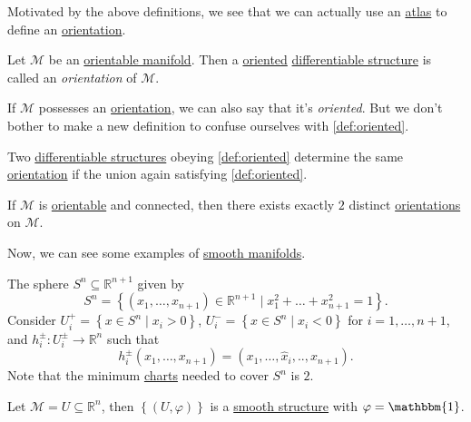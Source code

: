 Motivated by the above definitions, we see that we can actually use an \hyperref[def:atlas]{atlas} to define an \hyperref[def:orientation]{orientation}.

\begin{definition}[Orientation]\label{def:orientation}
	Let \(\mathcal{M} \) be an \hyperref[def:orientable]{orientable manifold}. Then a \hyperref[def:oriented]{oriented} \hyperref[def:smooth-structure]{differentiable structure} is called an \emph{orientation} of \(\mathcal{M} \).
\end{definition}

If \(\mathcal{M} \) possesses an \hyperref[def:orientation]{orientation}, we can also say that it's \emph{oriented}. But we don't bother to make a new definition to confuse ourselves with \autoref{def:oriented}.

\begin{remark}
	Two \hyperref[def:smooth-structure]{differentiable structures} obeying \autoref{def:oriented} determine the same \hyperref[def:orientation]{orientation} if the union again satisfying \autoref{def:oriented}.
\end{remark}

\begin{remark}
	If \(\mathcal{M} \) is \hyperref[def:orientable]{orientable} and connected, then there exists exactly \(2\) distinct \hyperref[def:orientation]{orientations} on \(\mathcal{M} \).
\end{remark}

Now, we can see some examples of \hyperref[def:smooth-manifold]{smooth manifolds}.

\begin{eg}[Sphere]
	The sphere \(S^n \subseteq \mathbb{R} ^{n+1}\) given by
	\[
		S^n = \left\{ (x_1, \ldots , x_{n+1} )\in \mathbb{R} ^{n+1} \mid x_1^2 + \ldots + x_{n+1}^2 = 1 \right\}.
	\]
	Consider \(U_i^+ = \left\{ x\in S^n \mid x_i > 0 \right\} \), \(U_i^-=\left\{ x\in S^n \mid x_i < 0 \right\} \) for \(i = 1, \ldots , n+1\), and \(h_i^{\pm} \colon U_i^{\pm} \to \mathbb{R} ^n\) such that
	\[
		h_i^{\pm}(x_1, \ldots , x_{n+1}) = (x_1, \ldots , \hat{x} _i, .., x_{n+1}).
	\]
	Note that the minimum \hyperref[def:coordinate-chart]{charts} needed to cover \(S^n\) is \(2\).
\end{eg}

\begin{eg}
	Let \(\mathcal{M} = U \subseteq \mathbb{R} ^n\), then \(\left\{ (U, \varphi ) \right\} \) is a \hyperref[def:smooth-structure]{smooth structure} with \(\varphi = \mathbbm{1}\).
\end{eg}

